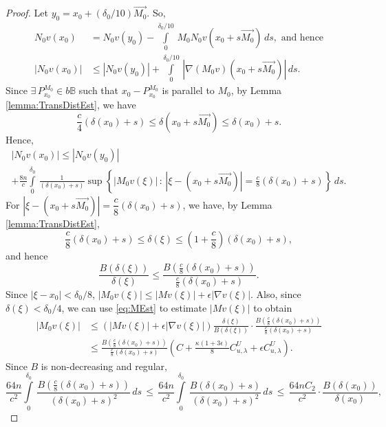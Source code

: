 \documentclass[12pt,a4paper]{amsart}
\numberwithin{equation}{section}
\theoremstyle{definition}
\begin{document}
\begin{proof}
Let $y_0 = x_0 + (\delta_0/10)\vec{M_0}$. So,
\begin{align*}
N_0v(x_0) &= N_0v(y_0) - \int\limits_0^{\delta_0/10}\, M_0N_0v(x_0+s\vec{M_0})\, ds, \text{ and hence}\\
{\left\lvert{N_0v(x_0)}\right\rvert} &\le {\left\lvert{N_0v(y_0)}\right\rvert} + \int\limits_0^{\delta_0/10}\, {\left\lvert{\nabla\left(M_0v\right)(x_0+s\vec{M_0})}\right\rvert}\, ds.
\end{align*}
Since $\exists\, P^{M_0}_{x_0} \in b\mathbb{B}$ such that $x_0-P^{M_0}_{x_0}$ is parallel to $M_0$, by Lemma 
\ref{lemma:TransDistEst}, we have
\[\frac{c}{4}\left(\delta(x_0)+s\right)\le\delta(x_0+s\vec{M_0}) \le \delta(x_0) + s.\]
Hence,
\begin{multline}\label{eq:N0Est}
{\left\lvert{N_0v(x_0)}\right\rvert} \le {\left\lvert{N_0v(y_0)}\right\rvert}\\
+ \frac{8n}{c}\int\limits_0^{\delta_0}\, \frac{1}{\left(\delta(x_0)+s\right)} \sup\left\{ {\left\lvert{M_0v(\xi)}\right\rvert}\, :\, {\left\lvert{\xi-(x_0+s\vec{M_0})}\right\rvert} = \frac{c}{8}\left(\delta(x_0)+s\right)\right\}\, ds.
\end{multline}
For ${\left\lvert{\xi-(x_0+s\vec{M_0})}\right\rvert} = \dfrac{c}{8}\left(\delta(x_0)+s\right)$, we have, by Lemma \ref{lemma:TransDistEst},
\[\frac{c}{8}\left(\delta(x_0)+s\right) \le \delta(\xi) \le \left(1+\frac{c}{8}\right)\left(\delta(x_0)+s\right), \]
and hence
\[\frac{B(\delta(\xi))}{\delta(\xi)} \le \frac{B\left(\frac{c}{8}\left(\delta(x_0)+s\right)\right)}{\frac{c}{8}\left(\delta(x_0)+s\right)}.\]
Since ${\left\lvert{\xi-x_0}\right\rvert} < \delta_0/8$, ${\left\lvert{M_0v(\xi)}\right\rvert} \le {\left\lvert{Mv(\xi)}\right\rvert} + \epsilon{\left\lvert{\nabla v(\xi)}\right\rvert}$. Also, since $\delta(\xi) < \delta_0/4$, we can use \eqref{eq:MEst} to estimate ${\left\lvert{Mv(\xi)}\right\rvert}$ to obtain
\begin{align*}
{\left\lvert{M_0v(\xi)}\right\rvert} &\le \left({\left\lvert{Mv(\xi)}\right\rvert}+\epsilon{\left\lvert{\nabla v(\xi)}\right\rvert}\right)\frac{\delta(\xi)}{B(\delta(\xi))}\cdot\frac{B\left(\frac{c}{8}\left(\delta(x_0)+s\right)\right)}{\frac{c}{8}\left(\delta(x_0)+s\right)}\\
&\le \frac{B\left(\frac{c}{8}\left(\delta(x_0)+s\right)\right)}{\frac{c}{8}\left(\delta(x_0)+s\right)}\left(C + \frac{\kappa(1+3\epsilon)}{8}C_{u,\lambda}^U+\epsilon C_{u,\lambda}^U\right).
\end{align*}
Since $B$ is non-decreasing and regular,
\[\frac{64n}{c^2}\int\limits_0^{\delta_0}\, \frac{B\left(\frac{c}{8}\left(\delta(x_0)+s\right)\right)}{\left(\delta(x_0)+s\right)^2}\, ds\, \le\, \frac{64n}{c^2}\int\limits_0^{\delta_0}\, \frac{B\left(\delta(x_0)+s\right)}{\left(\delta(x_0)+s\right)^2}\, ds\, \le\, \frac{64nC_2}{c^2}\cdot\frac{B\left(\delta(x_0)\right)}{\delta(x_0)},\]

\end{proof}
\end{document}
